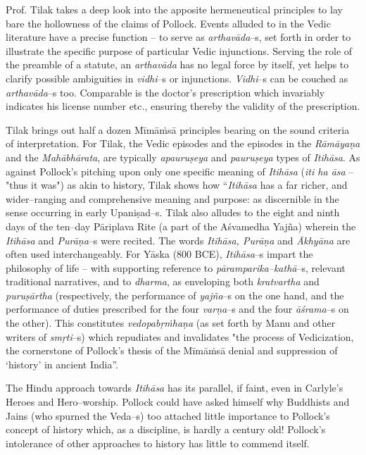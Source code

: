 Prof. Tilak takes a deep look into the apposite hermeneutical principles to lay bare the hollowness of the claims of Pollock. Events alluded to in the Vedic literature have a precise function – to serve as \textit{arthavāda}–s, set forth in order to illustrate the specific purpose of particular Vedic injunctions. Serving the role of the preamble of a statute, an \textit{arthavāda} has no legal force by itself, yet helps to clarify possible ambiguities in \textit{vidhi}–s or injunctions. \textit{Vidhi}–s can be couched as \textit{arthavāda}–s too. Comparable is the doctor’s prescription which invariably indicates his license number etc., ensuring thereby the validity of the prescription. 

Tilak brings out half a dozen Mīmāṁsā principles bearing on the sound criteria of interpretation. For Tilak, the Vedic episodes and the episodes in the \textit{Rāmāyaṇa} and the \textit{Mahābhārata}, are typically \textit{apauruṣeya} and \textit{pauruṣeya} types of \textit{Itihāsa}. As against Pollock’s pitching upon only one specific meaning of \textit{Itihāsa} (\textit{iti ha āsa} – "thus it was") as akin to history, Tilak shows how “\textit{Itihāsa} has a far richer, and wider–ranging and comprehensive meaning and purpose: as discernible in the sense occurring in early Upaniṣad–s. Tilak also alludes to the eight and ninth days of the ten–day Pāriplava Rite (a part of the Aśvamedha Yajña) wherein the \textit{Itihāsa} and \textit{Purāṇa}–s were recited. The words \textit{Itihāsa, Purāṇa} and \textit{Ākhyāna} are often used interchangeably. For Yāska (800 BCE), \textit{Itihāsa}–s impart the philosophy of life – with supporting reference to \textit{pāramparika–kathā}–s, relevant traditional narratives, and to \textit{dharma}, as enveloping both \textit{kratvartha} and \textit{puruṣārtha} (respectively, the performance of \textit{yajña}–s on the one hand, and the performance of duties prescribed for the four \textit{varṇa}–s and the four \textit{āśrama}–s on the other). This constitutes \textit{vedopabṛṁhaṇa} (as set forth by Manu and other writers of \textit{smṛti}–s) which repudiates and invalidates "the process of Vedicization, the cornerstone of Pollock’s thesis of the Mīmāṁsā denial and suppression of ‘history’ in ancient India”. 

The Hindu approach towards \textit{Itihāsa} has its parallel, if faint, even in Carlyle’s Heroes and Hero–worship. Pollock could have asked himself why Buddhists and Jains (who spurned the Veda–s) too attached little importance to Pollock’s concept of history which, as a discipline, is hardly a century old! Pollock’s intolerance of other approaches to history has little to commend itself.

